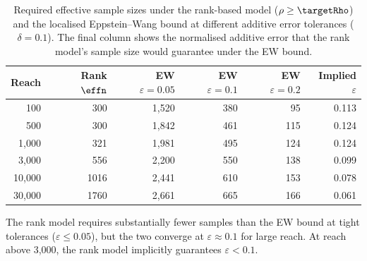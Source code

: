 \begin{table}[htbp]
\centering
\caption{Required effective sample sizes under the rank-based model ($\rho \geq \targetRho$) and the localised Eppstein--Wang bound at different additive error tolerances ($\delta = 0.1$). The final column shows the normalised additive error that the rank model's sample size would guarantee under the EW bound.}
\label{tab:ew_comparison}
\small
\begin{tabular}{@{}rrrrrr@{}}
\toprule
\textbf{Reach} & \textbf{Rank $\effn$} & \textbf{EW $\varepsilon{=}0.05$} & \textbf{EW $\varepsilon{=}0.1$} & \textbf{EW $\varepsilon{=}0.2$} & \textbf{Implied $\varepsilon$} \\
\midrule
100 & 300 & 1,520 & 380 & 95 & 0.113 \\
500 & 300 & 1,842 & 461 & 115 & 0.124 \\
1,000 & 321 & 1,981 & 495 & 124 & 0.124 \\
3,000 & 556 & 2,200 & 550 & 138 & 0.099 \\
10,000 & 1016 & 2,441 & 610 & 153 & 0.078 \\
30,000 & 1760 & 2,661 & 665 & 166 & 0.061 \\
\bottomrule
\end{tabular}

\vspace{0.5em}
\footnotesize
The rank model requires substantially fewer samples than the EW bound at tight tolerances ($\varepsilon \leq 0.05$), but the two converge at $\varepsilon \approx 0.1$ for large reach. At reach above 3{,}000, the rank model implicitly guarantees $\varepsilon < 0.1$.
\end{table}

